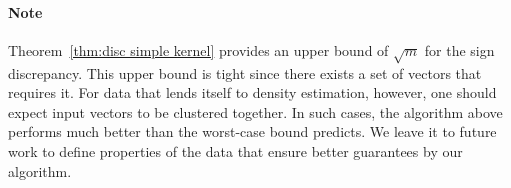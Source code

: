 \documentclass[anon,12pt]{colt2019} %
\newcommand{\E}{\mathbb{E}}
\renewcommand{\Pr}{\operatorname{Pr}}
\begin{document}
{\paragraph{Note} Theorem~\ref{thm:disc simple kernel} provides an upper bound of $\sqrt{m}$ for the sign discrepancy. 
This upper bound is tight since there exists a set of vectors that requires it. 
For data that lends itself to density estimation, however, one should expect input vectors to be clustered together.
In such cases, the algorithm above performs much better than the worst-case bound predicts. We leave it to future work to define properties of the data that ensure better guarantees by our algorithm.



\appendix

%
%
}
\end{document}
